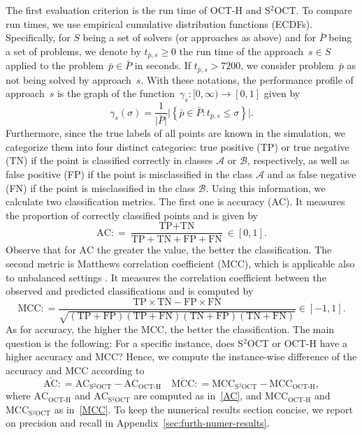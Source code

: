 \documentclass[a4paper,american,reqno]{amsart}
\newcommand{\define}{\mathrel{{\mathop:}{=}}}
\newcommand{\AC}{\text{AC}}
\newcommand{\TP}{\text{TP}}
\newcommand{\TN}{\text{TN}}
\newcommand{\FP}{\text{FP}}
\newcommand{\FN}{\text{FN}}
\newcommand{\OCTH}{\text{OCT-H}}
\newcommand{\MCC}{\text{MCC}}
\newcommand{\SOCT}{\text{S$^2$OCT}}
\newcommand{\rev}[1]{#1}
\begin{document}
The first evaluation criterion is the run time of \mbox{OCT-H} and S$^2$OCT.
To compare run times, we use empirical cumulative distribution
functions (ECDFs).
Specifically, for $S$ being a set of solvers (or approaches as above)
and for $\bar{P}$ being a set of problems, we denote by $t_{\bar{p},s}
\geq 0$ the run time of the approach~$s \in S$ applied to the
problem~$\bar{p} \in \bar{P}$ in seconds. If $t_{\bar{p},s} > 7200$,
we consider problem~$\bar{p}$ as not being solved by approach~$s$.
With these notations, the performance profile of approach~$s$ is the
graph of the function~$\gamma_s : [0, \infty) \to [0,1]$ given by
\begin{equation*}
  \gamma_s(\sigma) = \frac{1}{\vert \bar{P}
    \vert}\big\vert\left\{\bar{p} \in \bar{P}:
    t_{\bar{p},s} \leq \sigma \right\}\big \vert.
\end{equation*}
Furthermore, since the true labels of all points are known in the
simulation, we categorize them into four distinct categories: true
positive (TP) or true negative (TN) if the point is classified
correctly in classes $\mathcal{A}$ or $\mathcal{B}$, respectively, as
well as false positive (FP) if the point is misclassified in the
class $\mathcal{A}$  and as false negative (FN) if the point is
misclassified in the class $\mathcal{B}$.
Using this information, we calculate two classification metrics.
The first one is accuracy ($\AC$).
It measures the proportion of correctly classified points and is given
by
\begin{equation}
  \label{AC}
  \AC \define \frac{\TP + \TN}{\TP + \TN + \FP + \FN} \in [0,1].
\end{equation}
Observe that for $\AC$ the greater the value, the better the
classification.
The second metric is Matthews correlation coefficient ($\MCC$), \rev{ which is applicable also to unbalanced settings \parencite{chicco2023matthews}}. It
measures the  correlation coefficient between the observed and
predicted  classifications and is computed by
\begin{equation}
  \label{MCC}
  \MCC \define \frac{\TP \times \TN - \FP \times \FN }{\sqrt{(\TP +
      \FP)( \TP + \FN)(\TN + \FP)(\TN + \FN)}} \in [-1,1].
\end{equation}
As for accuracy, the higher the $\MCC$, the better the classification.  The
main question is the following: For a specific instance, does S$^2$OCT or OCT-H have
a higher accuracy and $\MCC$? Hence, we compute the instance-wise
difference of the accuracy and $\MCC$ according to
\begin{equation}
  \label{comparOCTH}
  \overline{\AC} \define \AC_{\SOCT}-\AC_{\OCTH}
  \quad
   \overline{\MCC} \define \MCC_{\SOCT}-\MCC_{\OCTH},
\end{equation}
where $\AC_{\OCTH}$ and $\AC_{\SOCT}$ are computed as in~\eqref{AC},
and $\MCC_{\OCTH}$ and $\MCC_{\SOCT}$ as in~\eqref{MCC}.
To keep the numerical results section concise, we report on precision
and recall in Appendix~\ref{sec:furth-numer-results}.
\end{document}
